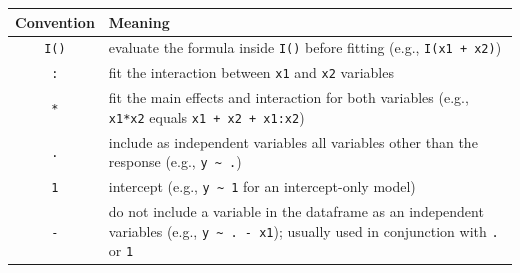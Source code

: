 \documentclass[]{book}
\begin{document}
\begin{longtable}[c]{@{}cl@{}}
\toprule
\begin{minipage}[b]{0.17\columnwidth}\centering\strut
Convention
\strut\end{minipage} &
\begin{minipage}[b]{0.74\columnwidth}\raggedright\strut
Meaning
\strut\end{minipage}\tabularnewline
\midrule
\endhead
\begin{minipage}[t]{0.17\columnwidth}\centering\strut
\texttt{I()}
\strut\end{minipage} &
\begin{minipage}[t]{0.74\columnwidth}\raggedright\strut
evaluate the formula inside \texttt{I()} before fitting (e.g.,
\texttt{I(x1\ +\ x2)})
\strut\end{minipage}\tabularnewline
\begin{minipage}[t]{0.17\columnwidth}\centering\strut
\texttt{:}
\strut\end{minipage} &
\begin{minipage}[t]{0.74\columnwidth}\raggedright\strut
fit the interaction between \texttt{x1} and \texttt{x2} variables
\strut\end{minipage}\tabularnewline
\begin{minipage}[t]{0.17\columnwidth}\centering\strut
\texttt{*}
\strut\end{minipage} &
\begin{minipage}[t]{0.74\columnwidth}\raggedright\strut
fit the main effects and interaction for both variables (e.g.,
\texttt{x1*x2} equals \texttt{x1\ +\ x2\ +\ x1:x2})
\strut\end{minipage}\tabularnewline
\begin{minipage}[t]{0.17\columnwidth}\centering\strut
\texttt{.}
\strut\end{minipage} &
\begin{minipage}[t]{0.74\columnwidth}\raggedright\strut
include as independent variables all variables other than the response
(e.g., \texttt{y\ \textasciitilde{}\ .})
\strut\end{minipage}\tabularnewline
\begin{minipage}[t]{0.17\columnwidth}\centering\strut
\texttt{1}
\strut\end{minipage} &
\begin{minipage}[t]{0.74\columnwidth}\raggedright\strut
intercept (e.g., \texttt{y\ \textasciitilde{}\ 1} for an intercept-only
model)
\strut\end{minipage}\tabularnewline
\begin{minipage}[t]{0.17\columnwidth}\centering\strut
\texttt{-}
\strut\end{minipage} &
\begin{minipage}[t]{0.74\columnwidth}\raggedright\strut
do not include a variable in the dataframe as an independent variables
(e.g., \texttt{y\ \textasciitilde{}\ .\ -\ x1}); usually used in
conjunction with \texttt{.} or \texttt{1}
\strut\end{minipage}\tabularnewline
\bottomrule
\end{longtable}
\end{document}
